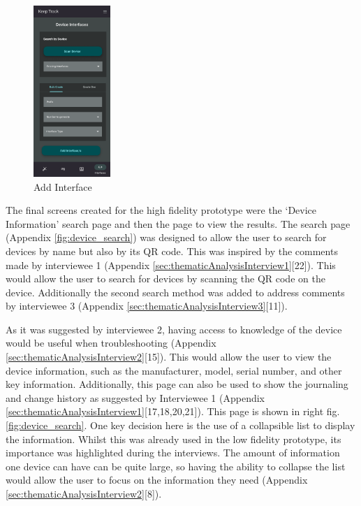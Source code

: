 \documentclass [11pt,a4paper]{article}
\begin{document}
\begin{figure}
    \centering
    \includegraphics[width=0.26\textwidth]{images/interface_add.png}
    \caption{Add Interface}
    \label{fig:interface_add}
\end{figure}

The final screens created for the high fidelity prototype were the `Device Information' search page and then the page to view the results. The search page (Appendix \ref{fig:device_search}) was designed to allow the user to search for devices by name but also by its QR code. This was inspired by the comments made by interviewee 1 (Appendix \ref{sec:thematicAnalysisInterview1}[22]). This would allow the user to search for devices by scanning the QR code on the device. Additionally the second search method was added to address comments by interviewee 3 (Appendix \ref{sec:thematicAnalysisInterview3}[11]). 

As it was suggested by interviewee 2, having access to knowledge of the device would be useful when troubleshooting (Appendix \ref{sec:thematicAnalysisInterview2}[15]). This would allow the user to view the device information, such as the manufacturer, model, serial number, and other key information. Additionally, this page can also be used to show the journaling and change history as suggested by Interviewee 1 (Appendix \ref{sec:thematicAnalysisInterview1}[17,18,20,21]). This page is shown in right fig.\ref{fig:device_search}. One key decision here is the use of a collapsible list to display the information. Whilst this was already used in the low fidelity prototype, its importance was highlighted during the interviews. The amount of information one device can have can be quite large, so having the ability to collapse the list would allow the user to focus on the information they need (Appendix \ref{sec:thematicAnalysisInterview2}[8]). 
\end{document}
